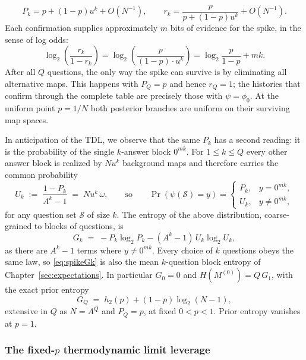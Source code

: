 \documentclass[11pt]{article}
\begin{document}
%
\begin{equation}
  P_k = p + (1-p)u^k + O(N^{-1}),
  \qquad
  r_k = \frac{p}{p + (1-p)u^k} + O(N^{-1}).
  \label{eq:spikelargeN}
\end{equation}
%
Each confirmation supplies approximately $m$ bits of evidence
for the spike, in the sense of log odds:
%
\begin{equation}
  \log_2\left(\frac{r_k}{1-r_k}\right) = \log_2\left(\frac{p}{(1-p)\cdot u^k}\right) = \log_2\frac{p}{1-p} + mk.
\end{equation}
%
After all $Q$ questions, the only way the spike can survive is by eliminating all alternative maps. This happens with 
$P_Q = p$ and hence $r_Q = 1$; the histories that confirm through the
complete table are precisely those with $\psi = \phi_0$. At the
uniform point $p = 1/N$ both posterior branches are uniform on their
surviving map spaces.

In anticipation of the TDL, we observe that the same $P_k$ has a second reading: it is the probability of the
single $k$-answer block $0^{mk}$. For $1 \le k \le Q$ every other answer block is realized by
$N u^k$ background maps and therefore carries the common probability
%
\begin{equation}
  U_k \;:=\; \frac{1 - P_k}{A^k - 1} \;=\; N u^k\,\omega,
  \qquad\text{so}\qquad
  \Pr(\psi(\mathcal S) = y)
  =\begin{cases}
    P_k, & y = 0^{mk},\\
    U_k, & y \neq 0^{mk},
  \end{cases}
  \label{eq:spikeUk}
\end{equation}
%
for any question set $\mathcal S$ of size $k$. The entropy of the above
distribution, coarse-grained to blocks of questions, is
%
\begin{equation}
  G_k \;=\; -P_k\log_2 P_k - (A^k-1)\,U_k\log_2 U_k,
  \label{eq:spikeGk}
\end{equation}
%
as there are $A^k-1$ terms where $y \neq 0^{mk}$.
Every choice of $k$ questions obeys the same law, so
\eqref{eq:spikeGk} is also the mean $k$-question block entropy of
Chapter~\ref{sec:expectations}. In particular $G_0 = 0$ and $H(M^{(0)}) = Q\,G_1$, with the exact prior entropy
%
\begin{equation}
  G_Q \;=\; h_2(p) + (1-p)\log_2(N-1),
  \label{eq:spikeHp}
\end{equation}
%
extensive in $Q$ as $N=A^Q$ and $P_Q=p$, at fixed $0 < p < 1$. Prior entropy vanishes at $p = 1$.

\subsubsection{The fixed-\texorpdfstring{$p$}{p} thermodynamic limit leverage}
\end{document}
